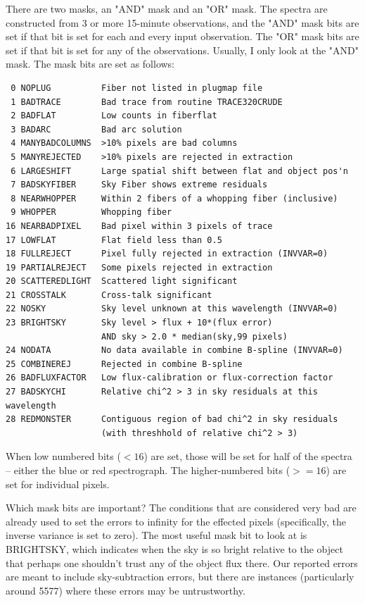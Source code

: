 \documentclass[12pt,preprint]{aastex}
\begin{document}
There are two masks, an "AND" mask and an "OR" mask. The spectra
are constructed from 3 or more 15-minute observations, and the
"AND" mask bits are set if that bit is set for each and every
input observation. The "OR" mask bits are set if that bit is set
for any of the observations. Usually, I only look at the "AND" mask.
The mask bits are set as follows:
\begin{verbatim}
 0 NOPLUG          Fiber not listed in plugmap file
 1 BADTRACE        Bad trace from routine TRACE320CRUDE
 2 BADFLAT         Low counts in fiberflat
 3 BADARC          Bad arc solution
 4 MANYBADCOLUMNS  >10% pixels are bad columns
 5 MANYREJECTED    >10% pixels are rejected in extraction
 6 LARGESHIFT      Large spatial shift between flat and object pos'n
 7 BADSKYFIBER     Sky Fiber shows extreme residuals
 8 NEARWHOPPER     Within 2 fibers of a whopping fiber (inclusive)
 9 WHOPPER         Whopping fiber
16 NEARBADPIXEL    Bad pixel within 3 pixels of trace
17 LOWFLAT         Flat field less than 0.5
18 FULLREJECT      Pixel fully rejected in extraction (INVVAR=0)
19 PARTIALREJECT   Some pixels rejected in extraction
20 SCATTEREDLIGHT  Scattered light significant
21 CROSSTALK       Cross-talk significant
22 NOSKY           Sky level unknown at this wavelength (INVVAR=0)
23 BRIGHTSKY       Sky level > flux + 10*(flux error)
                   AND sky > 2.0 * median(sky,99 pixels)
24 NODATA          No data available in combine B-spline (INVVAR=0)
25 COMBINEREJ      Rejected in combine B-spline
26 BADFLUXFACTOR   Low flux-calibration or flux-correction factor
27 BADSKYCHI       Relative chi^2 > 3 in sky residuals at this wavelength
28 REDMONSTER      Contiguous region of bad chi^2 in sky residuals
                   (with threshhold of relative chi^2 > 3)
\end{verbatim}
When low numbered bits ($<16$) are set, those will be set for half of the
spectra -- either the blue or red spectrograph. The higher-numbered bits
($>=16$) are set for individual pixels.

Which mask bits are important?
The conditions that are considered very bad are already used to set
the errors to infinity for the effected pixels (specifically, the
inverse variance is set to zero). The most useful mask bit to look
at is BRIGHTSKY, which indicates when the sky is so bright relative
to the object that perhaps one shouldn't trust any of the object
flux there. Our reported errors are meant to include sky-subtraction
errors, but there are instances (particularly around 5577) where
these errors may be untrustworthy.
\end{document}
